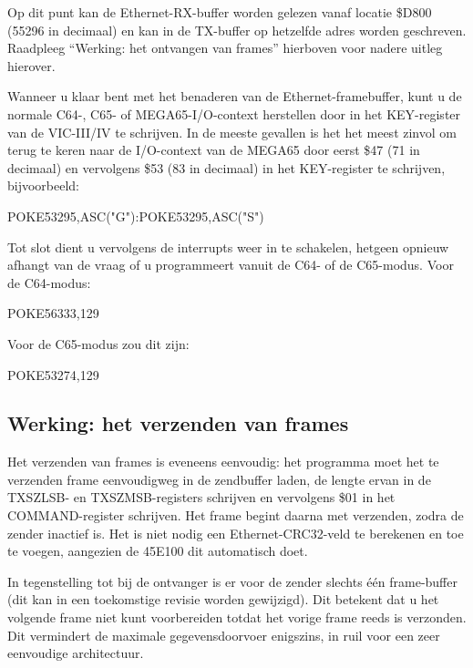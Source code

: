 Op dit punt kan de Ethernet-RX-buffer worden gelezen vanaf locatie \$D800 (55296 in decimaal) en kan in de TX-buffer op hetzelfde adres worden geschreven.  Raadpleeg ``Werking: het ontvangen van frames'' hierboven voor nadere uitleg hierover.

Wanneer u klaar bent met het benaderen van de Ethernet-framebuffer, kunt u de normale C64-, C65- of MEGA65-I/O-context herstellen door in het KEY-register van de VIC-III/IV te schrijven.  In de meeste gevallen is het het meest zinvol om terug te keren naar de I/O-context van de MEGA65 door eerst \$47 (71 in decimaal) en vervolgens \$53 (83 in decimaal) in het KEY-register te schrijven, bijvoorbeeld:

\begin{screencode}
POKE53295,ASC("G"):POKE53295,ASC("S")
\end{screencode}

Tot slot dient u vervolgens de interrupts weer in te schakelen, hetgeen opnieuw afhangt van de vraag of u programmeert vanuit de C64- of de C65-modus.  Voor de C64-modus:

\begin{screencode}
POKE56333,129
\end{screencode}

Voor de C65-modus zou dit zijn:

\begin{screencode}
POKE53274,129
\end{screencode}



\subsection{Werking: het verzenden van frames}

Het verzenden van frames is eveneens eenvoudig: het programma moet het te verzenden frame eenvoudigweg in de zendbuffer laden, de lengte ervan in de TXSZLSB- en TXSZMSB-registers schrijven en vervolgens \$01 in het COMMAND-register schrijven.  Het frame begint daarna met verzenden, zodra de zender inactief is.  Het is niet nodig een Ethernet-CRC32-veld te berekenen en toe te voegen, aangezien de 45E100 dit automatisch doet.

In tegenstelling tot bij de ontvanger is er voor de zender slechts één frame-buffer (dit kan in een toekomstige revisie worden gewijzigd).  Dit betekent dat u het volgende frame niet kunt voorbereiden totdat het vorige frame reeds is verzonden.  Dit vermindert de maximale gegevensdoorvoer enigszins, in ruil voor een zeer eenvoudige architectuur.

